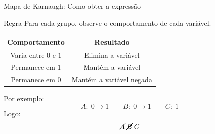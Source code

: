\begin{frame}{Mapa de Karnaugh: Como obter a expressão}
    \small
    \begin{block}{Regra}
        Para cada grupo, observe o comportamento de cada variável.
    \end{block}
    \begin{center}
        \begin{tabular}{c|c}
            Comportamento & Resultado \\ \hline
            Varia entre $0$ e $1$ & Elimina a variável \\
            Permanece em $1$ & Mantém a variável \\
            Permanece em $0$ & Mantém a variável negada
        \end{tabular}
    \end{center}

    Por exemplo:
    \[
        A:\;0\rightarrow1
        \qquad
        B:\;0\rightarrow1
        \qquad
        C:\;1
    \]
    Logo:
    \[
        \cancel{A}\;
        \cancel{B}\;
        C
    \]

\end{frame}